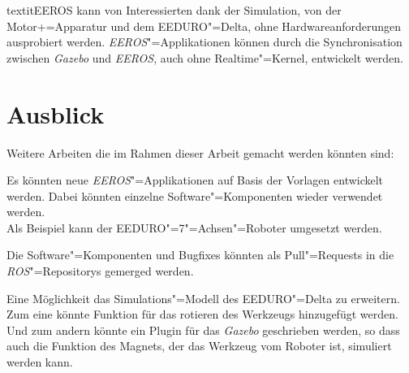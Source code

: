 textit{EEROS} kann von Interessierten dank der Simulation, von der Motor+=Apparatur und dem EEDURO"=Delta, ohne Hardwareanforderungen ausprobiert werden.
\textit{EEROS}"=Applikationen können durch die Synchronisation zwischen \textit{Gazebo} und \textit{EEROS}, auch ohne Realtime"=Kernel, entwickelt werden.

 

\section{Ausblick}

Weitere Arbeiten die im Rahmen dieser Arbeit gemacht werden könnten sind:

Es könnten neue \textit{EEROS}"=Applikationen auf Basis der Vorlagen entwickelt werden.
Dabei könnten einzelne Software"=Komponenten wieder verwendet werden.\\
Als Beispiel kann der EEDURO"=7"=Achsen"=Roboter umgesetzt werden.

Die Software"=Komponenten und Bugfixes könnten als Pull"=Requests in die \textit{ROS}"=Repositorys gemerged werden.

Eine Möglichkeit das Simulations"=Modell des EEDURO"=Delta zu erweitern.
Zum eine könnte Funktion für das rotieren des Werkzeugs hinzugefügt werden.
Und zum andern könnte ein Plugin für das \textit{Gazebo} geschrieben werden, so dass auch die Funktion des Magnets, der das Werkzeug vom Roboter ist, simuliert werden kann.


